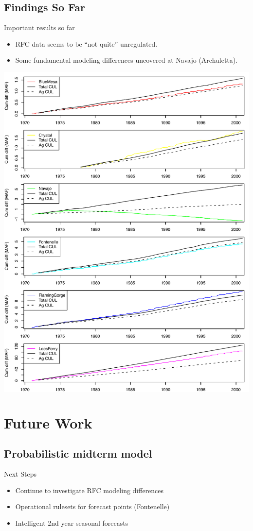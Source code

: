 \documentclass[compress]{beamer}
\begin{document}
\subsection{Findings So Far}
\begin{frame}{Important results so far}
\begin{itemize}
	\item RFC data seems to be ``not quite'' unregulated.  
	\item Some fundamental modeling differences uncovered at Navajo (Archuletta).
\end{itemize}
\includegraphics[width=\textwidth]{figs/cum-diff-navajo.pdf} 
\end{frame}

\section{Future Work}
\subsection{Probabilistic midterm model}
\begin{frame}{Next Steps}
\begin{itemize}
\item Continue to investigate RFC modeling differences
\item Operational rulesets for forecast points (Fontenelle)
\item Intelligent 2nd year seasonal forecasts
\end{itemize}
\end{frame}

\section{~}
\end{document}

